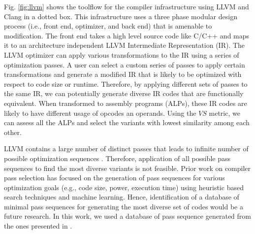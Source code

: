 \documentclass[conference]{IEEEtran}
\begin{document}
Fig. \ref{fig:llvm} shows the toolflow for the compiler infrastructure using LLVM and Clang in a dotted box. This infrastructure uses a three phase modular design process (i.e., front end, optimizer, and back end) that is amenable to modification. The front end takes a high level source code like C/C++ and maps it to an architecture independent LLVM Intermediate Representation (IR). The LLVM optimizer can apply various transformations to the IR using a series of optimization passes. A user can select a custom series of passes to apply certain transformations and generate a modified IR that is likely to be optimized with respect to code size or runtime. Therefore, by applying different sets of passes to the same IR, we can potentially generate diverse IR codes that are functionally equivalent. When transformed to assembly programs (ALPs), these IR codes are likely to have different usage of opcodes an operands. Using the $VS$ metric, we can assess all the ALPs and select the variants with lowest similarity among each other.

 LLVM contains a large number of distinct passes that leads to infinite number of possible optimization sequences \cite{jain2014finding}. Therefore, application of all possible pass sequences to find the most diverse variants is not feasible. Prior work on compiler pass selection has focused on the generation of pass sequences for various optimization goals (e.g., code size, power, execution time) using heuristic based search techniques and machine learning. Hence, identification of  a database of minimal pass sequences for generating the most diverse set of codes would be a future research. In this work, we used a database of pass sequence generated from the ones presented in \cite{ashouri2017micomp, jain2014finding}. 



     

\end{document}
